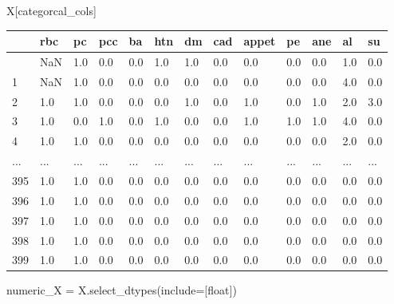 \documentclass[
  11pt,
  letterpaper,
  DIV=11,
  numbers=noendperiod]{scrartcl}
\newenvironment{Shaded}{\begin{snugshade}}{\end{snugshade}}
\newcommand{\NormalTok}[1]{\textcolor[rgb]{0.00,0.23,0.31}{#1}}
\newcommand{\OperatorTok}[1]{\textcolor[rgb]{0.37,0.37,0.37}{#1}}
\newcommand{\StringTok}[1]{\textcolor[rgb]{0.13,0.47,0.30}{#1}}
\begin{document}
\begin{Shaded}
\begin{Highlighting}[]
\NormalTok{X[categorcal\_cols]}
\end{Highlighting}
\end{Shaded}

\begin{longtable}[]{@{}lllllllllllll@{}}
\toprule\noalign{}
& rbc & pc & pcc & ba & htn & dm & cad & appet & pe & ane & al & su \\
\midrule\noalign{}
\endhead
\bottomrule\noalign{}
\endlastfoot
0 & NaN & 1.0 & 0.0 & 0.0 & 1.0 & 1.0 & 0.0 & 0.0 & 0.0 & 0.0 & 1.0 &
0.0 \\
1 & NaN & 1.0 & 0.0 & 0.0 & 0.0 & 0.0 & 0.0 & 0.0 & 0.0 & 0.0 & 4.0 &
0.0 \\
2 & 1.0 & 1.0 & 0.0 & 0.0 & 0.0 & 1.0 & 0.0 & 1.0 & 0.0 & 1.0 & 2.0 &
3.0 \\
3 & 1.0 & 0.0 & 1.0 & 0.0 & 1.0 & 0.0 & 0.0 & 1.0 & 1.0 & 1.0 & 4.0 &
0.0 \\
4 & 1.0 & 1.0 & 0.0 & 0.0 & 0.0 & 0.0 & 0.0 & 0.0 & 0.0 & 0.0 & 2.0 &
0.0 \\
... & ... & ... & ... & ... & ... & ... & ... & ... & ... & ... & ... &
... \\
395 & 1.0 & 1.0 & 0.0 & 0.0 & 0.0 & 0.0 & 0.0 & 0.0 & 0.0 & 0.0 & 0.0 &
0.0 \\
396 & 1.0 & 1.0 & 0.0 & 0.0 & 0.0 & 0.0 & 0.0 & 0.0 & 0.0 & 0.0 & 0.0 &
0.0 \\
397 & 1.0 & 1.0 & 0.0 & 0.0 & 0.0 & 0.0 & 0.0 & 0.0 & 0.0 & 0.0 & 0.0 &
0.0 \\
398 & 1.0 & 1.0 & 0.0 & 0.0 & 0.0 & 0.0 & 0.0 & 0.0 & 0.0 & 0.0 & 0.0 &
0.0 \\
399 & 1.0 & 1.0 & 0.0 & 0.0 & 0.0 & 0.0 & 0.0 & 0.0 & 0.0 & 0.0 & 0.0 &
0.0 \\
\end{longtable}

\begin{Shaded}
\begin{Highlighting}[]
\NormalTok{numeric\_X }\OperatorTok{=}\NormalTok{ X.select\_dtypes(include}\OperatorTok{=}\NormalTok{[}\StringTok{\textquotesingle{}float\textquotesingle{}}\NormalTok{])}
\end{Highlighting}
\end{Shaded}
\end{document}
